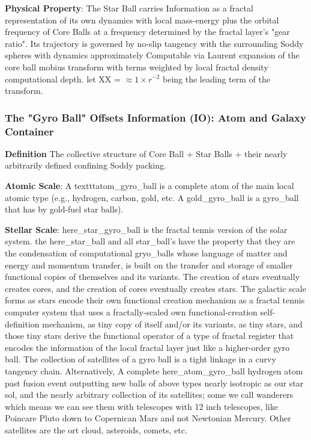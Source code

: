 \documentclass[11pt,a4paper]{article}
\begin{document}
    \noindent\textbf{Physical Property}: The Star Ball carries Information as a fractal representation of its own dynamics with local mass-energy plus the orbital frequency of Core Balls at a frequency determined by the fractal layer's "gear ratio". Its trajectory is governed by no-slip tangency with the surrounding Soddy spheres with dynamics approximately Computable via Laurent expansion of the core ball mobius transform with terms weighted by local fractal density computational depth. let XX = $\approx 1 \times r^{-2}$ being the leading term of the transform.


    \subsubsection{
    The "Gyro Ball" Offsets Information  (IO): Atom and Galaxy Container
    } 

    \noindent\textbf
    { Definition
    } 
    The collective structure of Core Ball + Star Balls + their nearly arbitrarily defined confining Soddy packing.

    \noindent\textbf{Atomic Scale}: A texttt{atom\_gyro\_ball} is a complete atom of the main local atomic type (e.g., hydrogen, carbon, gold, etc. A gold\_gyro\_ball is a gyro\_ball that has by gold-fuel star balls).

    \noindent\textbf{Stellar Scale}: here\_star\_gyro\_ball is the fractal tennis version of the solar system. the here\_star\_ball and all star\_ball's have the property that they are the condensation of computational gryo\_balls whose language of matter and energy and momentum transfer, is built on the transfer and storage of smaller functional copies of themselves and its variants. The creation of stars eventually creates cores, and the creation of cores eventually creates stars. The galactic scale forms as stars encode their own functional creation mechanism as a fractal tennis computer system that uses a fractally-scaled own functional-creation self-definition mechanism, as tiny copy of itself and/or its variants, as tiny stars, and those tiny stars derive the functional operator of a type of fractal register that encodes the information of the local fractal layer just like a higher-order gyro ball. The collection of satellites of a gyro ball is a tight linkage in a curvy tangency chain. Alternatively, A complete here\_atom\_gyro\_ball hydrogen atom past fusion event outputting new balls of above types nearly isotropic as our star sol, and the nearly arbitrary collection of its satellites; some we call wanderers which means we can see them with telescopes with 12 inch telescopes, like Poincare  Pluto down to Copernican Mars and not Newtonian Mercury. Other satellites are the ort cloud, asteroids, comets, etc.
\end{document}
